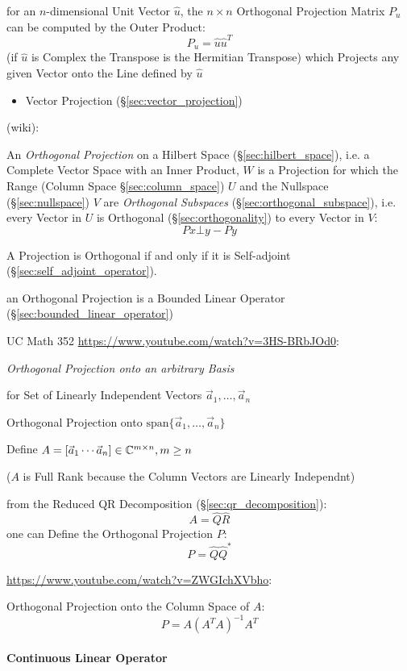 for an $n$-dimensional Unit Vector $\hat{u}$, the $n \times n$ Orthogonal
Projection Matrix $P_u$ can be computed by the Outer Product:
\[
  P_u = \hat{u}\hat{u}^T
\]
(if $\hat{u}$ is Complex the Transpose is the Hermitian Transpose) which
Projects any given Vector onto the Line defined by $\hat{u}$

\begin{itemize}
  \item Vector Projection (\S\ref{sec:vector_projection})
\end{itemize}

(wiki):

An \emph{Orthogonal Projection} on a Hilbert Space (\S\ref{sec:hilbert_space}),
i.e. a Complete Vector Space with an Inner Product,
$W$ is a Projection for which the Range (Column Space \S\ref{sec:column_space})
$U$ and the Nullspace (\S\ref{sec:nullspace}) $V$ are \emph{Orthogonal
  Subspaces} (\S\ref{sec:orthogonal_subspace}), i.e. every Vector in $U$ is
Orthogonal (\S\ref{sec:orthogonality}) to every Vector in $V$:
\[
  Px \bot y - Py
\]

A Projection is Orthogonal if and only if it is Self-adjoint
(\S\ref{sec:self_adjoint_operator}).

an Orthogonal Projection is a Bounded Linear Operator
(\S\ref{sec:bounded_linear_operator})


UC Math 352 \url{https://www.youtube.com/watch?v=3HS-BRbJOd0}:

\emph{Orthogonal Projection onto an arbitrary Basis}

for Set of Linearly Independent Vectors $\vec{a}_1, \ldots, \vec{a}_n$

Orthogonal Projection onto $\mathrm{span}\{\vec{a}_1, \ldots, \vec{a}_n\}$

Define $A = [\vec{a}_1 \cdots \vec{a}_n] \in \mathbb{C}^{m \times n}, m \geq n$

($A$ is Full Rank because the Column Vectors are Linearly Independnt)

from the Reduced QR Decomposition (\S\ref{sec:qr_decomposition}):
\[
  A = \hat{Q}\hat{R}
\]
one can Define the Orthogonal Projection $P$:
\[
  P = \hat{Q}\hat{Q}^*
\]


\url{https://www.youtube.com/watch?v=ZWGIchXVbho}:

Orthogonal Projection onto the Column Space of $A$:
\[
  P = A(A^TA)^{-1}A^T
\]



\paragraph{Continuous Linear Operator}\label{sec:continuous_linear}\hfill

